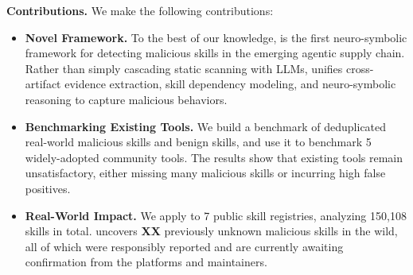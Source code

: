 \noindent \textbf{Contributions.} We make the following contributions:

\begin{itemize}[leftmargin=15pt]
    \item \textbf{Novel Framework.}
    To the best of our knowledge, \toolname is the first neuro-symbolic framework for detecting malicious skills in the emerging agentic supply chain. Rather than simply cascading static scanning with LLMs, \toolname unifies cross-artifact evidence extraction, skill dependency modeling, and neuro-symbolic reasoning to capture malicious behaviors.

    \item \textbf{Benchmarking Existing Tools.} We build a benchmark of deduplicated real-world malicious skills and benign skills, and use it to benchmark 5 widely-adopted community tools. The results show that existing tools remain unsatisfactory, either missing many malicious skills or incurring high false positives.

    \item \textbf{Real-World Impact.} We apply \toolname to 7 public skill registries, analyzing 150,108 skills in total. \toolname uncovers \textbf{XX} previously unknown malicious skills in the wild, all of which were responsibly reported and are currently awaiting confirmation from the platforms and maintainers.
\end{itemize}